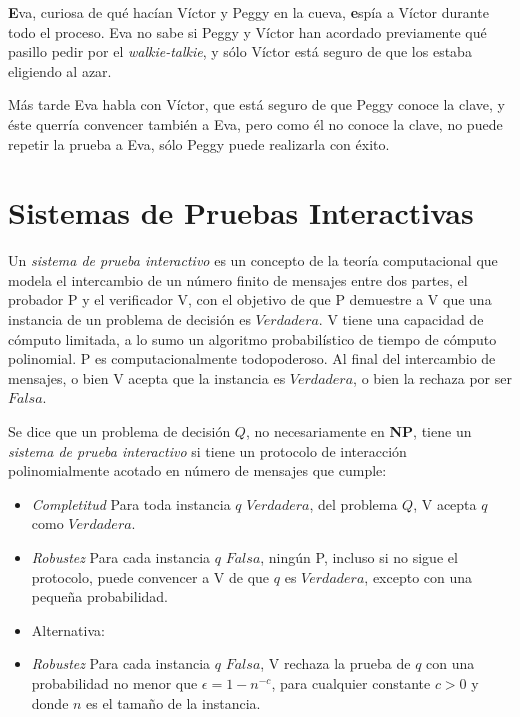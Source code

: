 \textbf{E}va, curiosa de qué hacían Víctor y Peggy en la cueva, \textbf{e}spía a Víctor durante todo el proceso. Eva no sabe si Peggy y Víctor han acordado previamente qué pasillo pedir por el \textit{walkie-talkie}, y sólo Víctor está seguro de que los estaba eligiendo al azar.%

Más tarde Eva habla con Víctor, que está seguro de que Peggy conoce la clave, y éste querría convencer también a Eva, pero como él no conoce la clave, no puede repetir la prueba a Eva, sólo Peggy puede realizarla con éxito.

\hfil

\section{Sistemas de Pruebas Interactivas}

Un \textit{sistema de prueba interactivo} es un concepto de la teoría computacional que modela el intercambio de un número finito de mensajes entre dos partes, el probador P y el verificador V, con el objetivo de que P demuestre a V que una instancia de un problema de decisión es $Verdadera$. V tiene una capacidad de cómputo limitada, a lo sumo un algoritmo probabilístico de tiempo de cómputo polinomial. P es computacionalmente todopoderoso. Al final del intercambio de mensajes, o bien V acepta que la instancia es $Verdadera$, o bien la rechaza por ser $Falsa$.

\begin{definition}

	
	Se dice que un problema de decisión $Q$, no necesariamente en \textbf{NP},  tiene un \textit{sistema de prueba interactivo} si tiene un protocolo de interacción polinomialmente acotado en número de mensajes que cumple:
	
	\begin{itemize}
		\item \textit{Completitud} Para toda instancia $q$ $Verdadera$, del problema $Q$, V acepta $q$ como $Verdadera$. 
		\item  \textit{Robustez} Para cada instancia $q$ $Falsa$, ningún P, incluso si no sigue el protocolo, puede convencer a V de que $q$ es $Verdadera$, excepto con una pequeña probabilidad.
		\item Alternativa:
		\item \textit{Robustez} Para cada instancia $q$ $Falsa$, V rechaza la prueba de $q$ con una probabilidad no menor que $\epsilon = 1-n^{-c}$, para cualquier constante $c>0$ y donde $n$ es el tamaño de la instancia.
	\end{itemize}

\end{definition}

